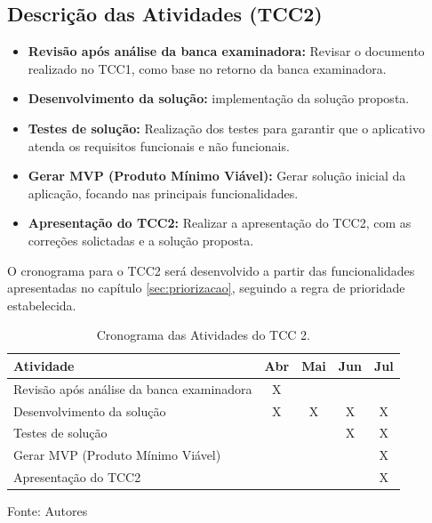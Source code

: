 \subsection{Descrição das Atividades (TCC2)}

\begin{itemize}
    \item \textbf{Revisão após análise da banca examinadora:} Revisar o documento realizado no TCC1, como base no retorno da banca examinadora.
    \item \textbf{Desenvolvimento da solução:} implementação da solução proposta.
    \item \textbf{Testes de solução:} Realização dos testes para garantir que o aplicativo atenda os requisitos funcionais e não funcionais.
    \item \textbf{Gerar MVP (Produto Mínimo Viável):} Gerar solução inicial da aplicação, focando nas principais funcionalidades.
    \item \textbf{Apresentação do TCC2:} Realizar a apresentação do TCC2, com as correções solictadas e a solução proposta.
\end{itemize}

O cronograma para o TCC2 será desenvolvido a partir das funcionalidades apresentadas no capítulo \ref{sec:priorizacao}, seguindo a regra de prioridade estabelecida.

\begin{table}[h]
    \centering
    \caption{Cronograma das Atividades do TCC 2.}
    \label{tab:cronograma}
    \begin{adjustbox}{width=\textwidth}
    \begin{tabular}{|l|c|c|c|c|}
        \hline
        \textbf{Atividade} & \textbf{Abr} & \textbf{Mai} & \textbf{Jun} & \textbf{Jul} \\
        \hline
        Revisão após análise da banca examinadora & X &  &  &  \\
        Desenvolvimento da solução & X & X & X & X \\
        Testes de solução &  &  & X & X \\
        Gerar MVP (Produto Mínimo Viável) &  &  &  & X \\
        Apresentação do TCC2 &  &  &  & X \\
        \hline
    \end{tabular}
    \end{adjustbox}
    \vspace{5mm}
    {\footnotesize Fonte: Autores}
\end{table}

